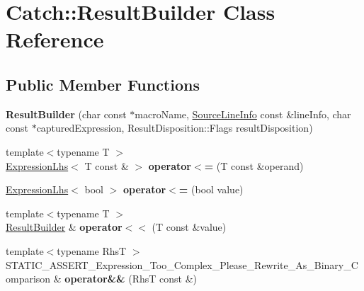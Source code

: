 \hypertarget{class_catch_1_1_result_builder}{\section{Catch\-:\-:Result\-Builder Class Reference}
\label{class_catch_1_1_result_builder}
}
\subsection*{Public Member Functions}
\begin{DoxyCompactItemize}
\item 
\hypertarget{class_catch_1_1_result_builder_a18c2929702bdde1f835e39717a0e554b}{{\bfseries Result\-Builder} (char const $\ast$macro\-Name, \hyperlink{struct_catch_1_1_source_line_info}{Source\-Line\-Info} const \&line\-Info, char const $\ast$captured\-Expression, Result\-Disposition\-::\-Flags result\-Disposition)}\label{class_catch_1_1_result_builder_a18c2929702bdde1f835e39717a0e554b}

\item 
\hypertarget{class_catch_1_1_result_builder_a1829db87e701758c4c520988883b25b5}{{\footnotesize template$<$typename T $>$ }\\\hyperlink{class_catch_1_1_expression_lhs}{Expression\-Lhs}$<$ T const \& $>$ {\bfseries operator$<$=} (T const \&operand)}\label{class_catch_1_1_result_builder_a1829db87e701758c4c520988883b25b5}

\item 
\hypertarget{class_catch_1_1_result_builder_a3b87b20bcd1ef9e630880e59eeefba2a}{\hyperlink{class_catch_1_1_expression_lhs}{Expression\-Lhs}$<$ bool $>$ {\bfseries operator$<$=} (bool value)}\label{class_catch_1_1_result_builder_a3b87b20bcd1ef9e630880e59eeefba2a}

\item 
\hypertarget{class_catch_1_1_result_builder_a5aa79ce6160ab8cd800eb65bbd7a28a4}{{\footnotesize template$<$typename T $>$ }\\\hyperlink{class_catch_1_1_result_builder}{Result\-Builder} \& {\bfseries operator$<$$<$} (T const \&value)}\label{class_catch_1_1_result_builder_a5aa79ce6160ab8cd800eb65bbd7a28a4}

\item 
\hypertarget{class_catch_1_1_result_builder_a2bbd6b026765202aee224a14d24c68bc}{{\footnotesize template$<$typename Rhs\-T $>$ }\\S\-T\-A\-T\-I\-C\-\_\-\-A\-S\-S\-E\-R\-T\-\_\-\-Expression\-\_\-\-Too\-\_\-\-Complex\-\_\-\-Please\-\_\-\-Rewrite\-\_\-\-As\-\_\-\-Binary\-\_\-\-Comparison \& {\bfseries operator\&\&} (Rhs\-T const \&)}\label{class_catch_1_1_result_builder_a2bbd6b026765202aee224a14d24c68bc}


\end{DoxyCompactItemize}
